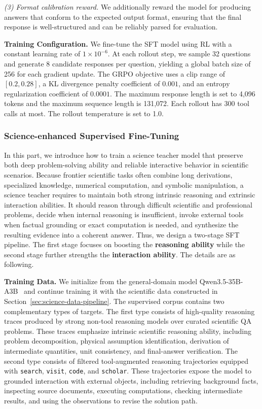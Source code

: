 \textit{(3) Format calibration reward.} We additionally reward the model for producing answers that conform to the expected output format, ensuring that the final response is well-structured and can be reliably parsed for evaluation.

\textbf{Training Configuration.} We fine-tune the SFT model using RL with a constant learning rate of $1 \times 10^{-6}$. At each rollout step, we sample 32 questions and generate 8 candidate responses per question, yielding a global batch size of 256 for each gradient update. The GRPO objective uses a clip range of $[0.2, 0.28]$, a KL divergence penalty coefficient of $0.001$, and an entropy regularization coefficient of $0.0001$. The maximum response length is set to 4,096 tokens and the maximum sequence length is 131,072. Each rollout has 300 tool calls at most. The rollout temperature is set to 1.0.




\subsubsection{Science-enhanced Supervised Fine-Tuning}
In this part, we introduce how to train a science teacher model that preserve both deep problem-solving ability and reliable interactive behavior in scientific scenarios. Because frontier scientific tasks often combine long derivations, specialized knowledge, numerical computation, and symbolic manipulation, a science teacher requires to maintain both strong intrinsic reasoning and extrinsic interaction abilities. It should reason through difficult scientific and professional problems, decide when internal reasoning is insufficient, invoke external tools when factual grounding or exact computation is needed, and synthesize the resulting evidence into a coherent answer. Thus, we design a two-stage SFT pipeline. The first stage focuses on boosting the \textbf{reasoning ability} while the second stage further strengths the \textbf{interaction ability}. The details are as following. 

\textbf{Training Data.}
We initialize from the general-domain model Qwen3.5-35B-A3B~\citep{Qwen3.5} and continue training it with the scientific data constructed in Section~\ref{sec:science-data-pipeline}. The supervised corpus contains two complementary types of targets. The first type consists of high-quality reasoning traces produced by strong non-tool reasoning models over curated scientific QA problems. These traces emphasize intrinsic scientific reasoning ability, including problem decomposition, physical assumption identification, derivation of intermediate quantities, unit consistency, and final-answer verification. The second type consists of filtered tool-augmented reasoning trajectories equipped with \texttt{search}, \texttt{visit}, \texttt{code}, and \texttt{scholar}. These trajectories expose the model to grounded interaction with external objects, including retrieving background facts, inspecting source documents, executing computations, checking intermediate results, and using the observations to revise the solution path.

